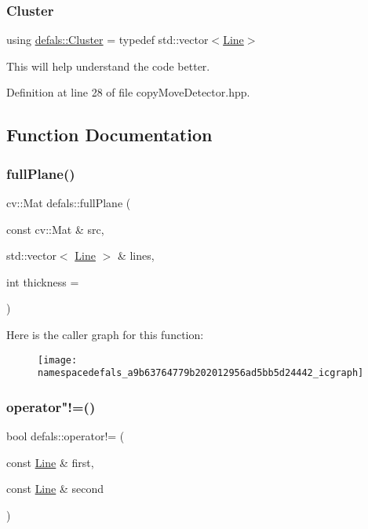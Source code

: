 \subsubsection{\texorpdfstring{Cluster}{Cluster}}
{\footnotesize\ttfamily using \hyperlink{namespacedefals_a93b34e2e4f989ac1ebef9f660cf3a303}{defals\+::\+Cluster} = typedef std\+::vector$<$\hyperlink{classdefals_1_1_line}{Line}$>$}

This will help understand the code better. 

Definition at line 28 of file copy\+Move\+Detector.\+hpp.



\subsection{Function Documentation}
\mbox{\label{namespacedefals_a9b63764779b202012956ad5bb5d24442}} 
\subsubsection{\texorpdfstring{full\+Plane()}{fullPlane()}}
{\footnotesize\ttfamily cv\+::\+Mat defals\+::full\+Plane (\begin{DoxyParamCaption}\item[{const cv\+::\+Mat \&}]{src,  }\item[{std\+::vector$<$ \hyperlink{classdefals_1_1_line}{Line} $>$ \&}]{lines,  }\item[{int}]{thickness = {} }\end{DoxyParamCaption})}

Here is the caller graph for this function\+:\nopagebreak
\begin{figure}[H]
\begin{center}
\leavevmode
\texttt{[image: namespacedefals\_a9b63764779b202012956ad5bb5d24442\_icgraph]}
\end{center}
\end{figure}
\mbox{\label{namespacedefals_a56782f10ddcb64e96fb17b2ee89fe6c3}} 
\subsubsection{\texorpdfstring{operator"!=()}{operator!=()}}
{\footnotesize\ttfamily bool defals\+::operator!= (\begin{DoxyParamCaption}\item[{const \hyperlink{classdefals_1_1_line}{Line} \&}]{first,  }\item[{const \hyperlink{classdefals_1_1_line}{Line} \&}]{second }\end{DoxyParamCaption})\hspace{0.3cm}{\ttfamily [inline]}}



